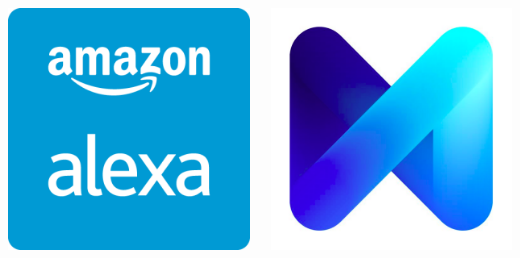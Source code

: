 \documentclass{beamer}
\begin{document}
\begin{frame}
\begin{columns}
\begin{minipage}[c][0.4\textheight][c]{\linewidth}
    \includegraphics[width=0.8\linewidth]{alexa}
\end{minipage}
\begin{minipage}[c][0.4\textheight][c]{\linewidth}
    \centering
    \includegraphics[width=0.8\linewidth]{facebookm}
\end{minipage}
\end{columns}
\end{frame}
\end{document}
